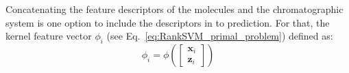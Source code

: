 \documentclass[10p]{article}
\newcommand{\x}{\mathbf{x}}
\newcommand{\z}{\mathbf{z}}
\begin{document}
Concatenating the feature descriptors of the molecules and the chromatographic system is one option to include the descriptors in to prediction. For that, the kernel feature vector $\phi_i$ (see Eq.~\eqref{eq:RankSVM_primal_problem}) defined as:
\begin{equation}
    \phi_i = \phi\left(\left[\begin{matrix}\x_i\\\z_i\end{matrix}\right]\right)
\end{equation}


\newpage
\printbibliography
\end{document}
